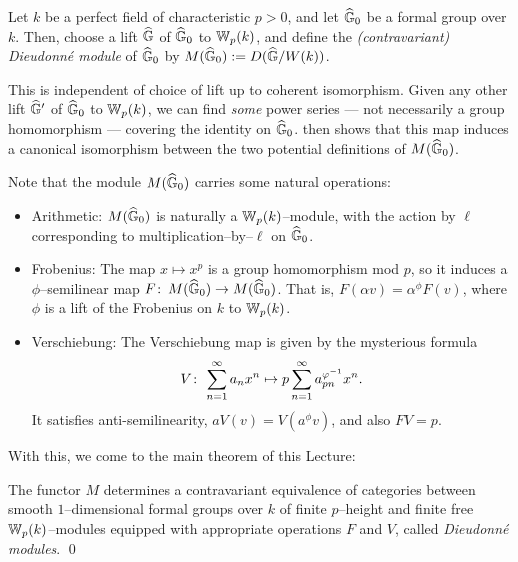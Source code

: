 \begin{definition}
Let $k$ be a perfect field of characteristic $p > 0$, and let $\widehat{\mathbb G}_0$ be a formal group over $k$.  Then, choose a lift $\widehat{\mathbb G}$ of $\widehat{\mathbb G}_0$ to $\mathbb W_p(k)$, and define the \textit{(contravariant) Dieudonn\'e module} of $\widehat{\mathbb G}_0$ by $M(\widehat{\mathbb G}_0) := D(\widehat{\mathbb G} / W(k))$.
\end{definition}

\begin{remark}
This is independent of choice of lift up to coherent isomorphism.  Given any other lift $\widehat{\mathbb G}'$ of $\widehat{\mathbb G}_0$ to $\mathbb W_p(k)$, we can find \emph{some} power series --- not necessarily a group homomorphism --- covering the identity on $\widehat{\mathbb G}_0$.   then shows that this map induces a canonical isomorphism between the two potential definitions of $M(\widehat{\mathbb G}_0)$.
\end{remark}

Note that the module $M(\widehat{\mathbb G}_0)$ carries some natural operations:
\begin{itemize}
\item Arithmetic: $M(\widehat{\mathbb G}_0)$ is naturally a $\mathbb W_p(k)$--module, with the action by $\ell$ corresponding to multiplication--by--$\ell$ on $\widehat{\mathbb G}_0$. 
\item Frobenius: The map $x \mapsto x^p$ is a group homomorphism mod $p$, so it induces a $\phi$--semilinear map $F\colon\thinspace M(\widehat{\mathbb G}_0) \to M(\widehat{\mathbb G}_0)$.  That is, $F(\alpha v) = \alpha^\phi F(v)$, where $\phi$ is a lift of the Frobenius on $k$ to $\mathbb W_p(k)$.
\item Verschiebung: The Verschiebung map is given by the mysterious formula \[V\colon\thinspace \sum_{n=1}^\infty a_n x^n \mapsto p \sum_{n=1}^\infty a_{pn}^{\varphi^{-1}} x^n.\] It satisfies anti-semilinearity, $aV(v) = V(a^\phi v)$, and also $FV = p$.
\end{itemize}
With this, we come to the main theorem of this Lecture:

\begin{theorem}
The functor $M$ determines a contravariant equivalence of categories between smooth $1$--dimensional formal groups over $k$ of finite $p$--height and finite free $\mathbb W_p(k)$--modules equipped with appropriate operations $F$ and $V$, called \textit{Dieudonn\'e modules}. \qed {}
\end{theorem}

